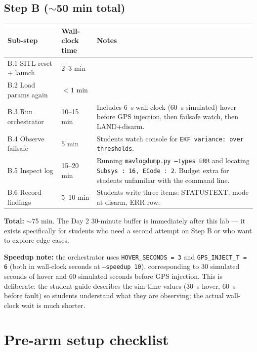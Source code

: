 \documentclass[a4paper,11pt,twoside]{article}
\begin{document}
\subsection*{Step B ($\sim$50 min total)}

\begin{center}\small
\begin{tabular}{|p{4.5cm}|p{3.0cm}|p{7.0cm}|}\hline
\textbf{Sub-step} & \textbf{Wall-clock time} & \textbf{Notes} \\ \hline
B.1 SITL reset + launch & 2--3 min & \\ \hline
B.2 Load params again & $<1$ min & \\ \hline
B.3 Run orchestrator & 10--15 min & Includes 6~s wall-clock (60~s simulated) hover before GPS injection, then failsafe watch, then LAND+disarm. \\ \hline
B.4 Observe failsafe & 5 min & Students watch console for \texttt{EKF variance: over thresholds}. \\ \hline
B.5 Inspect log & 15--20 min & Running \texttt{mavlogdump.py --types ERR} and locating \texttt{Subsys : 16, ECode : 2}. Budget extra for students unfamiliar with the command line. \\ \hline
B.6 Record findings & 5--10 min & Students write three items: STATUSTEXT, mode at disarm, ERR row. \\ \hline
\end{tabular}
\end{center}

\textbf{Total:} $\sim$75 min. The Day 2 30-minute buffer is immediately after this lab --- it exists specifically for students who need a second attempt on Step B or who want to explore edge cases.

\textbf{Speedup note:} the orchestrator uses \texttt{HOVER\_SECONDS = 3} and \texttt{GPS\_INJECT\_T = 6} (both in wall-clock seconds at \texttt{--speedup 10}), corresponding to 30 simulated seconds of hover and 60 simulated seconds before GPS injection. This is deliberate: the student guide describes the sim-time values (30~s hover, 60~s before fault) so students understand what they are observing; the actual wall-clock wait is much shorter.

\section*{Pre-arm setup checklist}
\end{document}
